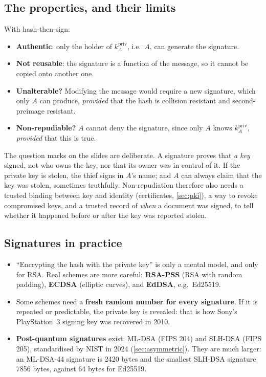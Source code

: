\subsection{The properties, and their limits}

With hash-then-sign:
\begin{itemize}
    \item \textbf{Authentic}: only the holder of $k_A^{\mathrm{priv}}$, i.e.\ $A$, can generate the signature.
    \item \textbf{Not reusable}: the signature is a function of the message, so it cannot be copied onto another one.
    \item \textbf{Unalterable?} Modifying the message would require a new signature, which only $A$ can produce, \emph{provided} that the hash is collision resistant and second-preimage resistant.
    \item \textbf{Non-repudiable?} $A$ cannot deny the signature, since only $A$ knows $k_A^{\mathrm{priv}}$, \emph{provided} that this is true.
\end{itemize}
The question marks on the slides are deliberate. A signature proves that \emph{a key} signed, not who owns the key, nor that its owner was in control of it. If the private key is stolen, the thief signs in $A$'s name; and $A$ can always claim that the key was stolen, sometimes truthfully. Non-repudiation therefore also needs a trusted binding between key and identity (certificates, \cref{sec:pki}), a way to revoke compromised keys, and a trusted record of \emph{when} a document was signed, to tell whether it happened before or after the key was reported stolen.

\subsection{Signatures in practice}

\begin{itemize}
    \item \enquote{Encrypting the hash with the private key} is only a mental model, and only for RSA. Real schemes are more careful: \textbf{RSA-PSS} (RSA with random padding), \textbf{ECDSA} (elliptic curves), and \textbf{EdDSA}, e.g.\ Ed25519.
    \item Some schemes need a \textbf{fresh random number for every signature}. If it is repeated or predictable, the private key is revealed: that is how Sony's PlayStation~3 signing key was recovered in 2010.
    \item \textbf{Post-quantum signatures} exist: ML-DSA (FIPS 204) and SLH-DSA (FIPS 205), standardised by NIST in 2024 (\cref{sec:asymmetric}). They are much larger: an ML-DSA-44 signature is 2420 bytes and the smallest SLH-DSA signature 7856 bytes, against 64 bytes for Ed25519.
\end{itemize}


